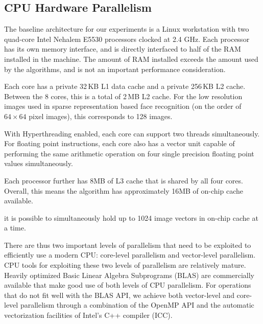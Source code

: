 \documentclass[10pt,twocolumn,letterpaper]{article}
\begin{document}
\subsection{CPU Hardware Parallelism} 
The baseline architecture for our experiments is a Linux workstation with two
quad-core Intel Nehalem E5530 processors clocked at 2.4 GHz.  Each processor
has its own memory interface, and is directly interfaced to half of the RAM
installed in the machine.  The amount of RAM installed exceeds the amount used
by the algorithms, and is not an important performance consideration.  

Each core has a private 32\,KB L1 data cache and a private 256\,KB L2 cache.  
Between the 8 cores, this is a total of 2\,MB L2 cache.
For the low resolution images used in sparse representation based
face recognition (on the order of $64\times64$ pixel images), this corresponds to
128 images.

With Hyperthreading
enabled, each core can support two threads simultaneously.  For floating point
instructions, each core also has a vector unit capable of performing the same
arithmetic operation on four single precision floating point values
simultaneously.  

Each processor further has 8MB of L3 cache that is shared by all four cores.
Overall, this means the algorithm has approximately 16MB of on-chip cache
available.  

it is possible
to simultaneously hold up to 1024 image vectors in on-chip cache at a time.  

There are thus two important levels of parallelism that need to be exploited to
efficiently use a modern CPU: core-level parallelism and vector-level
parallelism. CPU tools for exploiting these two levels of parallelism are
relatively mature.  Heavily optimized Basic Linear Algebra Subprograms (BLAS) are
commercially available that make good use of both levels of CPU parallelism.
For operations that do not fit well with the BLAS API, we 
achieve both vector-level and core-level parallelism through a combination of
the OpenMP API \cite{dagum2002openmp} and the automatic vectorization 
facilities of Intel's C++ compiler (ICC)\cite{dulong1999overview}.
\end{document}
